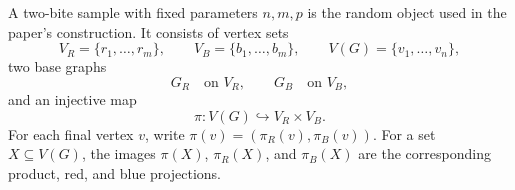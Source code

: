 \begin{definition}
A two-bite sample with fixed parameters \(n,m,p\) is the random object used in
the paper's construction.  It consists of vertex sets
\[
V_R=\{r_1,\ldots,r_m\},\qquad
V_B=\{b_1,\ldots,b_m\},\qquad
V(G)=\{v_1,\ldots,v_n\},
\]
two base graphs
\[
G_R\quad\text{on }V_R,
\qquad
G_B\quad\text{on }V_B,
\]
and an injective map
\[
\pi:V(G)\hookrightarrow V_R\times V_B.
\]
For each final vertex \(v\), write
\(\pi(v)=(\pi_R(v),\pi_B(v))\).  For a set \(X\subseteq V(G)\), the images
\(\pi(X)\), \(\pi_R(X)\), and \(\pi_B(X)\) are the corresponding product, red,
and blue projections.
\end{definition}
